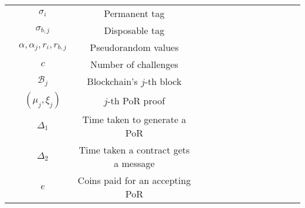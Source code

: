 \begin{table*}[!htbp]
\begin{center}
{\begin{tabular}{|c|c|c|c|c|c|c|c|c|c|c|c|c|c|}
&\cellcolor{white!20}\scriptsize$\sigma_{\scriptscriptstyle i}$&\cellcolor{white!20}\scriptsize Permanent tag   \\  
 &\cellcolor{gray!20}\scriptsize$\sigma_{\scriptscriptstyle b,j}$&\cellcolor{gray!20}\scriptsize Disposable tag   \\    
 
    &\cellcolor{white!20}\scriptsize$\alpha, \alpha_{\scriptscriptstyle j}, r_{\scriptscriptstyle i},r_{\scriptscriptstyle b,j}$&\cellcolor{white!20}\scriptsize Pseudorandom values  \\ 
                
&\cellcolor{gray!20}\scriptsize$c$&\cellcolor{gray!20}\scriptsize Number of challenges \\ 
        
&\cellcolor{white!20}\scriptsize$\mathcal {B}_{\scriptscriptstyle j}$&\cellcolor{white!20}\scriptsize Blockchain's $j{\text{-th}}$ block\\ 

&\cellcolor{gray!20}\scriptsize$(\mu_{\scriptscriptstyle j},\xi_{\scriptscriptstyle j})$&\cellcolor{gray!20}\scriptsize $j{\text{-th}}$ PoR proof\\ 
&\cellcolor{white!20}\scriptsize$\Delta_{\scriptscriptstyle 1}$&\cellcolor{white!20}\scriptsize Time taken to generate  a PoR\\ 

&\cellcolor{gray!20}\scriptsize$\Delta_{\scriptscriptstyle 2}$&\cellcolor{gray!20}\cellcolor{gray!20}\scriptsize Time taken a contract gets a message\\ 

&\cellcolor{white!20}\scriptsize$e$&\cellcolor{white!20}\scriptsize Coins paid for an accepting PoR\\ 

\hline                 
\end{tabular}\label{table:notation-table}

}
\end{center}
\end{table*}





























